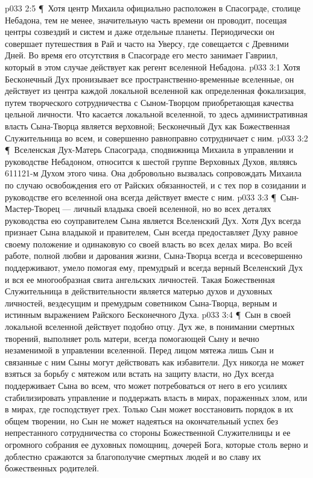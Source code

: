 \vs p033 2:5 \P\ Хотя центр Михаила официально расположен в Спасограде, столице Небадона, тем не менее, значительную часть времени он проводит, посещая центры созвездий и систем и даже отдельные планеты. Периодически он совершает путешествия в Рай и часто на Уверсу, где совещается с Древними Дней. Во время его отсутствия в Спасограде его место занимает Гавриил, который в этом случае действует как регент вселенной Небадона.
\vs p033 3:1 Хотя Бесконечный Дух пронизывает все пространственно\hyp{}временные вселенные, он действует из центра каждой локальной вселенной как определенная фокализация, путем творческого сотрудничества с Сыном\hyp{}Творцом приобретающая качества цельной личности. Что касается локальной вселенной, то здесь административная власть Сына\hyp{}Творца является верховной; Бесконечный Дух как Божественная Служительница во всем, и совершенно равноправно сотрудничает с ним.
\vs p033 3:2 \P\ Вселенская Дух\hyp{}Матерь Спасограда, сподвижница Михаила в управлении и руководстве Небадоном, относится к шестой группе Верховных Духов, являясь 611121\hyp{}м Духом этого чина. Она добровольно вызвалась сопровождать Михаила по случаю освобождения его от Райских обязанностей, и с тех пор в созидании и руководстве его вселенной она всегда действует вместе с ним.
\vs p033 3:3 \P\ Сын\hyp{}Мастер\hyp{}Творец --- личный владыка своей вселенной, но во всех деталях руководства ею соуправителем Сына является Вселенский Дух. Хотя Дух всегда признает Сына владыкой и правителем, Сын всегда предоставляет Духу равное своему положение и одинаковую со своей власть во всех делах мира. Во всей работе, полной любви и дарования жизни, Сына\hyp{}Творца всегда и всесовершенно поддерживают, умело помогая ему, премудрый и всегда верный Вселенский Дух и вся ее многообразная свита ангельских личностей. Такая Божественная Служительница в действительности является матерью духов и духовных личностей, вездесущим и премудрым советником Сына\hyp{}Творца, верным и истинным выражением Райского Бесконечного Духа.
\vs p033 3:4 \P\ Сын в своей локальной вселенной действует подобно отцу. Дух же, в понимании смертных творений, выполняет роль матери, всегда помогающей Сыну и вечно незаменимой в управлении вселенной. Перед лицом мятежа лишь Сын и связанные с ним Сыны могут действовать как избавители. Дух никогда не может взяться за борьбу с мятежом или встать на защиту власти, но Дух всегда поддерживает Сына во всем, что может потребоваться от него в его усилиях стабилизировать управление и поддержать власть в мирах, пораженных злом, или в мирах, где господствует грех. Только Сын может восстановить порядок в их общем творении, но Сын не может надеяться на окончательный успех без непрестанного сотрудничества со стороны Божественной Служителницы и ее огромного собрания ее духовных помощниц, дочерей Бога, которые столь верно и доблестно сражаются за благополучие смертных людей и во славу их божественных родителей.
